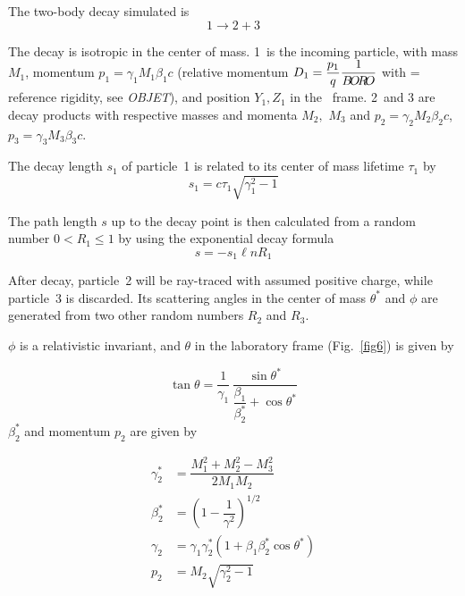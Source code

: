\noindent The two-body decay simulated is 
 $$ 1 \longrightarrow  2+3 $$

\noindent The decay is isotropic in the center of mass. 
1~is the incoming particle, with mass $ M_1 $, momentum $ p_1=\gamma_1 M_1\beta_ 1c $ (relative 
momentum $ D_1= \dfrac{p_1 }{ q} \dfrac{1 }{B\!O\!R\!O} $ with \BORO   = reference
rigidity, see \textsl{OBJET}),  and position $ Y_1,Z_1 $ in the \zgou\ frame. 
2~and 3 are decay products with respective masses and momenta $ M_2, $ $ M_3 $ and 
$ p_2=\gamma_ 2M_2\beta_2c$,  $ p_3=\gamma_ 3M_3\beta_ 3c$.  

\noindent The decay length  $ s_1 $ of particle~1 is related to its center of 
mass lifetime $ \tau_ 1 $ by 
$$ s_1=c\tau_ 1 \sqrt{ \gamma^ 2_1 -1} $$

\noindent The path length $ s $ up to the decay point is then calculated from
a random number $ 0<R_1\leq 1 $ by using the exponential decay formula
$$ s = - s_1 \ell n R_1 $$

\noindent After decay, particle~2  will  be ray-traced with assumed positive
charge, while particle~3 is discarded.  Its scattering angles in the center of mass 
$ \theta^\ast $ and $\phi$ are generated from two other random numbers 
$R_2$ and $ R_3$. 
%
%

$\phi$ is a relativistic invariant, and $\theta$ in the laboratory
frame (Fig.~\ref{fig6}) is given by    

$$ \tan \theta = \dfrac{1 }{ \gamma_1}\, 
    \dfrac{ \sin \theta^ \ast }{\dfrac{\beta_1 }{ \beta^ \ast_ 2}+ \cos \theta^\ast} 
    $$
%
  $ \beta^ \ast_ 2 $ and momentum $ p_2 $ are given by 

 \begin{align*}
	 \gamma^\ast_ 2 
	         & = \dfrac{M^2_1 + M^2_2 - M^2_3 }{ 2M_1M_2} \\
	\beta^\ast_ 2 
	         & =  \left( 1- \dfrac{1 }{ \gamma^ 2} \right)^{1/2} \\
	\gamma_2
	         & =   \gamma_1\gamma^ \ast_ 2 
	         	\left(1+\beta_1 \beta^\ast_ 2 \cos \theta^ \ast \right) \\
	p_2 
	         & = M_2 \sqrt{ \gamma^2_2 -1} 
 \end{align*}
 
